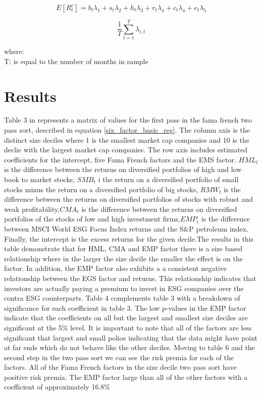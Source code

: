 \documentclass[12pt,oneside,reqno]{amsart}
\begin{document}
\begin{equation}
    E[R^e_{t}]= b_t\lambda_1+s_t\lambda_2 +h_t \lambda_3 +r_t\lambda_4 +c_t \lambda_4 + e_t \lambda_5
    \label{second_pass}
\end{equation}

\begin{equation}
    \frac{1}{T}\sum^T_{t=1}\lambda_{i,t}
    \label{summing_lamda}
\end{equation}
\begin{center}
    where:\\
    T: is equal to the number of months in sample
\end{center}




\section{Results}
\label{Results}
Table 3 in represents a matrix of values for the first pass in the fama french two pass sort, described in equation \eqref{six_factor_basic_reg}. The column axis is the distinct size deciles where 1 is the smallest market cap companies and 10 is the declie with the largest market cap companies. The row axis includes estimated coefficients for the intercept, five Fama French factors and the EMS factor. $HML_{t}$ is the difference between the returns on diversified portfolios of high and low book to market stocks, $SMB_{t}$ i the return on a diversified portfolio of small stocks minus the return on a diversified portfolio of big stocks, $RMW_t$ is the difference between the returns on diversified portfolios of stocks with robust and weak profitability,$CMA_{t}$ is the difference between the returns on diversified portfolios of the stocks of low and high investment firms,$EMP_t$ is the difference between MSCI World ESG Focus Index returns and the S\&P petroleum index. Finally, the intercept is the excess returns for the given decile.The results in this table demonstrate that for HML, CMA and EMP factor there is a size based relationship where in the larger the size decile the smaller the effect is on the factor. In addition, the EMP factor also exhibits a  a consistent negative relationship between the EGS factor and returns. This relationship indicates that investors are actually paying a premium to invest in ESG companies over the contra ESG counterparts. Table 4 complements table 3 with a breakdown of significance for each coefficient in table 3. The low p-values in the EMP factor indicate that the coefficients on all but the largest and smallest size deciles are significant at the 5\% level. It is important to note that all of the factors are less significant that largest and small polios indicating that the data might have point at far ends which do not behave like the other deciles.  Moving to table 6 and the second step in the two pass sort we can see the risk premia for each of the factors. All of the Fama French factors in the size decile two pass sort have positive risk premia. The EMP factor large than all of the other factors with a coefficient of approximately  16.8\%
\end{document}
